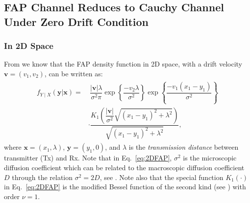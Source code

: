 \documentclass[conference]{IEEEtran}
\theoremstyle{definition}
\theoremstyle{plain}
\begin{document}

\subsection{FAP Channel Reduces to Cauchy Channel Under Zero Drift Condition}\label{subsec:MR-A}
\subsubsection{In 2D Space}
From \cite{lee2022arrival} we know that
the FAP density function in 2D space, with a drift velocity $\mathbf{v}=(v_1,v_2)$, can be written as:
\begin{align}
\begin{split}
f_{Y \mid X}(\mathbf{y}|\mathbf{x})=&\ \dfrac{|\mathbf{v}|\lambda}{\sigma^2\pi}\exp\left\{\dfrac{-v_2 \lambda}{\sigma^2}\right\} \exp\left\{\dfrac{-v_1(x_1-y_1)}{\sigma^2}\right\}\\ &\cdot\dfrac{K_1\left(\dfrac{|\mathbf{v}|}{\sigma^2}\sqrt{(x_1-y_1)^2+\lambda^2}\right)}{\sqrt{(x_1-y_1)^2+\lambda^2}},
\end{split}
\label{eq:2DFAP}
\end{align}
where $\mathbf{x}=(x_1,\lambda)$, $\mathbf{y}=(y_1,0)$, and $\lambda$ is the \textit{transmission distance} between transmitter (Tx) and Rx. Note that in Eq.~\eqref{eq:2DFAP}, $\sigma^2$ is the microscopic diffusion coefficient which can be related to the macroscopic diffusion coefficient $D$ through the relation $\sigma^2=2D$, see \cite{farsad2016comprehensive}.
Note also that the special function $K_{1}(\cdot)$ in Eq.~\eqref{eq:2DFAP} is the modified Bessel function of the second kind (see \cite{bell2004special}) with order $\nu=1$.
\end{document}
